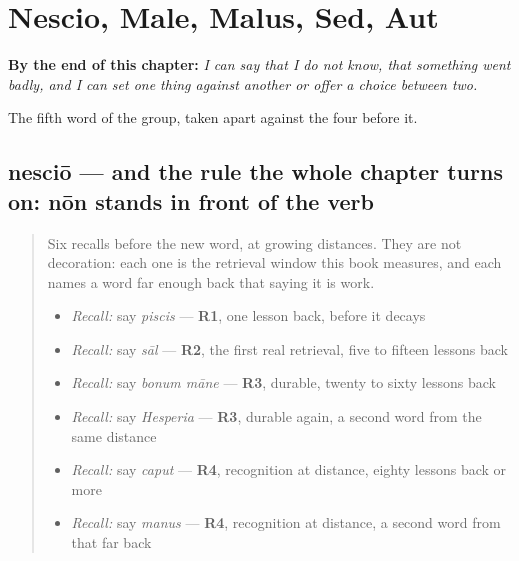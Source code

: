 
\chapter{Nescio, Male, Malus, Sed, Aut}
\label{ch:la-negatio}

\begin{chapteropening}
\textbf{By the end of this chapter:} \emph{I can say that I do not know, that something went badly, and I can set one thing against another or offer a choice between two.}

The fifth word of the group, taken apart against the four before it.
\end{chapteropening}

\section[nesciō, nescīre]{nesciō — and the rule the whole chapter turns on: nōn stands in front of the verb}

\label{lesson:LA-C48-nescio}



\begin{quote}
Six recalls before the new word, at growing distances. They are not decoration: each one is the retrieval window this book measures, and each names a word far enough back that saying it is work.

\begin{itemize}
\raggedright
  \item \emph{Recall:} say \emph{piscis} — \textbf{R1}, one lesson back, before it decays
  \item \emph{Recall:} say \emph{sāl} — \textbf{R2}, the first real retrieval, five to fifteen lessons back
  \item \emph{Recall:} say \emph{bonum māne} — \textbf{R3}, durable, twenty to sixty lessons back
  \item \emph{Recall:} say \emph{Hesperia} — \textbf{R3}, durable again, a second word from the same distance
  \item \emph{Recall:} say \emph{caput} — \textbf{R4}, recognition at distance, eighty lessons back or more
  \item \emph{Recall:} say \emph{manus} — \textbf{R4}, recognition at distance, a second word from that far back
\end{itemize}
\end{quote}

